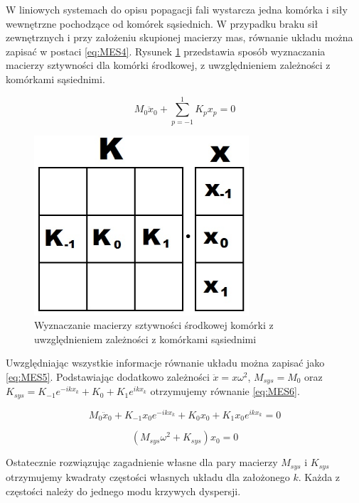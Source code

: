 W liniowych systemach do opisu popagacji fali wystarcza jedna komórka i siły wewnętrzne pochodzące od komórek sąsiednich. W przypadku braku sił zewnętrznych i przy założeniu skupionej macierzy mas, równanie układu można zapisać w postaci \ref{eq:MES4}. Rysunek \ref{fig:komorki_preta_sztywnosc} przedstawia sposób wyznaczania macierzy sztywności dla komórki środkowej, z uwzględnieniem zależności z komórkami sąsiednimi.

\begin{equation} \label{eq:MES4}
M_0\ddot x_0 + \sum_{p=-1}^1 K_p x_p = 0
\end{equation}

\begin{figure}[h]
\centering
\includegraphics[width=8cm]{Zdjecia/2/metoda_numeryczna3_sztywnosc}
\caption{Wyznaczanie macierzy sztywności środkowej komórki z uwzględnieniem zależności z komórkami sąsiednimi}
\label{fig:komorki_preta_sztywnosc}
\end{figure}

Uwzględniając wszystkie informacje równanie układu można zapisać jako \ref{eq:MES5}. Podstawiając dodatkowo zależności \( \ddot x = x \omega^2 \), \( M_{sys} = M_0 \) oraz \( K_{sys} = K_{-1} e^{-ikx_k} + K_0 + K_1 e^{ikx_k} \) otrzymujemy równanie \ref{eq:MES6}.

\begin{equation} \label{eq:MES5}
M_0\ddot x_0 + K_{-1} x_0 e^{-ikx_k} + K_0 x_0 + K_1 x_0 e^{ikx_k} = 0
\end{equation}

\begin{equation} \label{eq:MES6}
 (M_{sys}\omega^2 + K_{sys})x_0 = 0
\end{equation}

Ostatecznie rozwiązując zagadnienie własne dla pary macierzy \( M_{sys} \) i \( K_{sys} \) otrzymujemy kwadraty częstości własnych układu dla założonego \( k \). Każda z częstości należy do jednego modu krzywych dyspersji.


